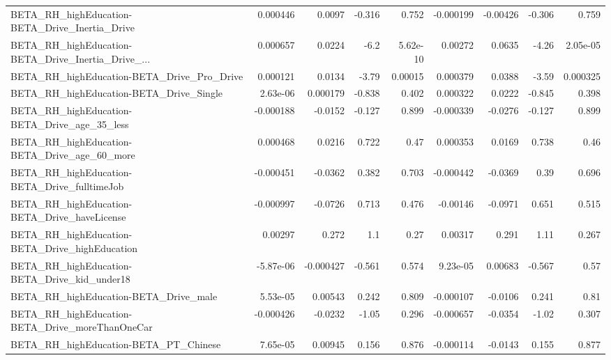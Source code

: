 \begin{tabular}{lrrrrrrrr}
BETA\_RH\_highEducation-BETA\_Drive\_Inertia\_Drive     &    0.000446 &       0.0097 &   -0.316 &    0.752 &  -0.000199 &    -0.00426 &       -0.306 &         0.759 \\
BETA\_RH\_highEducation-BETA\_Drive\_Inertia\_Drive\_... &    0.000657 &       0.0224 &     -6.2 & 5.62e-10 &    0.00272 &      0.0635 &        -4.26 &      2.05e-05 \\
BETA\_RH\_highEducation-BETA\_Drive\_Pro\_Drive         &    0.000121 &       0.0134 &    -3.79 &  0.00015 &   0.000379 &      0.0388 &        -3.59 &      0.000325 \\
BETA\_RH\_highEducation-BETA\_Drive\_Single            &    2.63e-06 &     0.000179 &   -0.838 &    0.402 &   0.000322 &      0.0222 &       -0.845 &         0.398 \\
BETA\_RH\_highEducation-BETA\_Drive\_age\_35\_less       &   -0.000188 &      -0.0152 &   -0.127 &    0.899 &  -0.000339 &     -0.0276 &       -0.127 &         0.899 \\
BETA\_RH\_highEducation-BETA\_Drive\_age\_60\_more       &    0.000468 &       0.0216 &    0.722 &     0.47 &   0.000353 &      0.0169 &        0.738 &          0.46 \\
BETA\_RH\_highEducation-BETA\_Drive\_fulltimeJob       &   -0.000451 &      -0.0362 &    0.382 &    0.703 &  -0.000442 &     -0.0369 &         0.39 &         0.696 \\
BETA\_RH\_highEducation-BETA\_Drive\_haveLicense       &   -0.000997 &      -0.0726 &    0.713 &    0.476 &   -0.00146 &     -0.0971 &        0.651 &         0.515 \\
BETA\_RH\_highEducation-BETA\_Drive\_highEducation     &     0.00297 &        0.272 &      1.1 &     0.27 &    0.00317 &       0.291 &         1.11 &         0.267 \\
BETA\_RH\_highEducation-BETA\_Drive\_kid\_under18       &   -5.87e-06 &    -0.000427 &   -0.561 &    0.574 &   9.23e-05 &     0.00683 &       -0.567 &          0.57 \\
BETA\_RH\_highEducation-BETA\_Drive\_male              &    5.53e-05 &      0.00543 &    0.242 &    0.809 &  -0.000107 &     -0.0106 &        0.241 &          0.81 \\
BETA\_RH\_highEducation-BETA\_Drive\_moreThanOneCar    &   -0.000426 &      -0.0232 &    -1.05 &    0.296 &  -0.000657 &     -0.0354 &        -1.02 &         0.307 \\
BETA\_RH\_highEducation-BETA\_PT\_Chinese              &    7.65e-05 &      0.00945 &    0.156 &    0.876 &  -0.000114 &     -0.0143 &        0.155 &         0.877 \\

\end{tabular}
